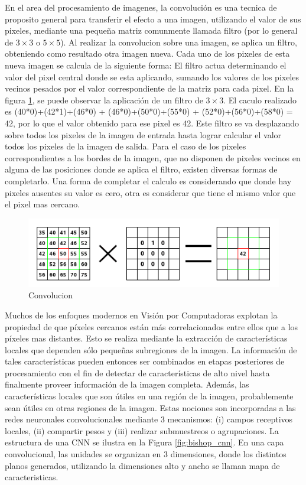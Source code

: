 \documentclass[a4paper,11pt,spanish]{book}
\begin{document}
      En el area del procesamiento de imagenes, la convolución es una tecnica de proposito general para transferir el efecto a una imagen, utilizando el valor de sus pixeles,
      mediante una pequeña matriz comunmente llamada filtro (por lo general de $3\times3$ o $5\times5$).
      Al realizar la convolucion sobre una imagen, se aplica un filtro, obteniendo como resultado otra imagen nueva. Cada uno de los pixeles de esta nueva imagen se calcula de la siguiente forma:
      El filtro actua determinando el valor del pixel central donde se esta aplicando, sumando los valores de los pixeles vecinos pesados por el valor correspondiente de la matriz para
      cada pixel. En la figura \ref{fig:convolution}, se puede observar la aplicación de un filtro de $3\times3$. El caculo realizado es (40*0)+(42*1)+(46*0) + (46*0)+(50*0)+(55*0) + (52*0)+(56*0)+(58*0) = 42,
      por lo que el valor obtenido para ese pixel es 42.
      Este filtro se va desplazando sobre todos los pixeles de la imagen de entrada hasta lograr calcular el valor todos los pixeles de la imagen de salida. Para el caso de los pixeles 
      correspondientes a los bordes de la imagen, que no disponen de pixeles vecinos en alguna de las posiciones donde se aplica el filtro, existen diversas formas de completarlo. 
      Una forma de completar el calculo es considerando que donde hay pixeles ausentes su valor es cero, otra es considerar que tiene el mismo valor que el pixel mas cercano.
      \begin{figure}[h]
	\begin{center}
	\includegraphics[width=0.8\linewidth]{./img/convolution.png}
	\end{center}
	\caption{Convolucion}
	\label{fig:convolution}
      \end{figure}

      Muchos de los enfoques modernos en Visión por Computadoras explotan la propiedad de que píxeles cercanos están más correlacionados entre ellos 
      que a los píxeles mas distantes. Esto se realiza mediante la extracción de características locales que dependen sólo pequeñas subregiones de la imagen. La información de tales características pueden entonces ser combinados
      en etapas posteriores de procesamiento con el fin de detectar de características de alto nivel hasta finalmente proveer información de la imagen completa. Además, las características
      locales que son útiles en una región de la imagen, probablemente sean útiles en otras regiones de la imagen.
      Estas nociones son incorporadas a las redes neuronales convolucionales mediante 3 mecanismos: (i) campos receptivos locales, (ii) compartir pesos y (iii) realizar submuestreos o agrupaciones.
      La estructura de una CNN se ilustra en la Figura \ref{fig:bishop_cnn}. En una capa convolucional, las unidades se organizan en 3 dimensiones, donde los distintos planos generados,
      utilizando la dimensiones alto y ancho se llaman mapa de caracteristicas.
\end{document}
